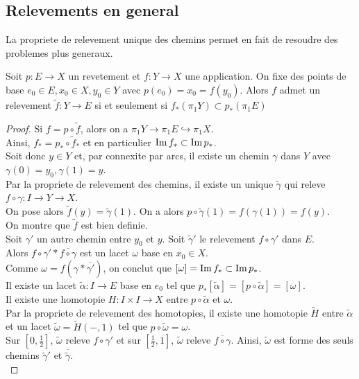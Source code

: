 \documentclass[../main.tex]{subfiles}
\begin{document}
\subsection{Relevements en general}
La propriete de relevement unique des chemins permet en fait de resoudre des problemes plus generaux.
\begin{propo}
Soit $p: E \to X$ un revetement et $f:Y\to X$ une application. On fixe des points de base $e_0\in E, x_0\in X,y_0\in Y$ avec $p( e_0) =x_0= f( y_0) $. Alors $f$ admet un relevement $\tilde f: Y\to E$ si et seulement si $f_\ast ( \pi_1 Y) \subset p_\ast (\pi_1 E) $ 
\end{propo}
\begin{proof}
Si $f= p\circ \tilde f$, alors on a $\pi_1Y \to \pi_1 E \hookrightarrow \pi_1 X$.\\
Ainsi, $f_\ast = p_\ast\circ \tilde f _\ast$ et en particulier $\operatorname{Im} f_\ast \subset \operatorname{Im} p_\ast$.\\
Soit donc $y\in Y$ et, par connexite par arcs, il existe un chemin $\gamma$ dans $Y$ avec $\gamma( 0) = y_0, \gamma( 1) = y$.\\
Par la propriete de relevement des chemins, il existe un unique $\tilde\gamma$ qui releve $f\circ\gamma:I\to Y \to X$.\\
On pose alors $\tilde f( y) = \tilde\gamma( 1) $. On a alors $p\circ \tilde\gamma( 1) = f(\gamma( 1) )= f( y)$.\\
On montre que $\tilde f$ est bien definie.\\
Soit $\gamma'$ un autre chemin entre $y_0$ et $y$. Soit $\tilde\gamma'$ le relevement $f\circ\gamma'$ dans $E$.\\
Alors $f\circ \gamma' \ast \overline{f\circ\gamma}$ est un lacet $\omega $ base en $x_0\in X$.\\
Comme $\omega= f( \gamma\ast\overline{  \gamma' }) $, on conclut que $[\omega] = \operatorname{Im} f_\ast \subset \operatorname{Im} p_\ast$.\\
Il existe un lacet $\tilde\alpha:I\to E$ base en $e_0$ tel que $p_\ast [ \tilde\alpha] = [ p\circ \tilde\alpha] = [ \omega] $.\\
Il existe une homotopie $H: I\times I\to X$ entre $p\circ\tilde\alpha$ et $\omega$.\\
Par la propriete de relevement des homotopies, il existe une homotopie $\tilde H$ entre $\tilde \alpha$ et un lacet $\tilde\omega= \tilde H( -,1) $ tel que $p\circ \tilde\omega= \omega$.\\
Sur $[0,\frac{1}{2}]$, $\tilde\omega$ releve $f\circ\gamma'$ et sur $ [ \frac{1}{2},1] $, $\tilde\omega$ releve $ \overline{f\circ\gamma}$. Ainsi, $\tilde\omega$ est forme des seuls chemins $\tilde\gamma' $ et $ \overline{\tilde \gamma}$.\\

\end{proof}
\end{document}
